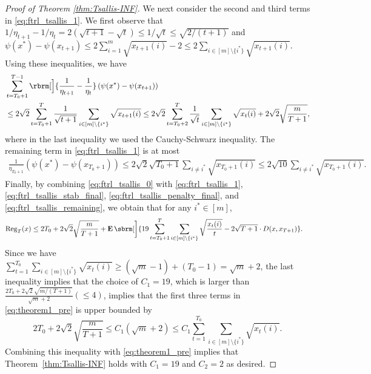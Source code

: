 \begin{proof}[Proof of Theorem \ref{thm:Tsallis-INF}]
We next consider the second and third terms in \eqref{eq:ftrl_tsallis_1}.
We first observe that 
$
{1}/{\eta_{t+1}}
-
{1}/{\eta_{t}}
=
2 (\sqrt{t+1} - \sqrt{t}) 
\leq
1/\sqrt{t}
\leq
\sqrt{2 / (t+1)}
$
and 
$\psi(x^*) - \psi(x_{t+1})
\leq
2 \sum_{i=1}^m \sqrt{x_{t+1}(i)} - 2
\leq
2 \sum_{i \in [m] \setminus \{i^*\}} \sqrt{x_{t+1}(i)}.
$
Using these inequalities, we have
\begin{align}
    &
    \sum_{t=T_0+1}^{T-1}
    \rbrm[\Big]{
        \frac{1}{\eta_{t+1}}
        -
        \frac{1}{\eta_{t}}
    }
    \left(
        \psi(x^*)
        -
        \psi( x_{t+1} )
    \right)
    \nonumber \\
    &\leq
    2 \sqrt{2} \sum_{t=T_0+1}^{T}
    \frac{1}{\sqrt{t+1}}
    \sum_{i \in [m] \setminus \{i^*\}} \sqrt{x_{t+1}(i)}
    \leq
    2 \sqrt{2} \sum_{t=T_0+2}^{T}
    \frac{1}{\sqrt{t}}
    \sum_{i \in [m] \setminus \{i^*\}} \sqrt{x_t(i)}
    +
    2 \sqrt{2} \sqrt{\frac{m}{T+1}}
    ,
    \label{eq:ftrl_tsallis_penalty_final}
\end{align}
where in the last inequality we used the Cauchy-Schwarz inequality.
The remaining term in \eqref{eq:ftrl_tsallis_1} is at most
\begin{align}
    \frac{1}{\eta_{T_0+1}} \left(
        \psi(x^*)
        -
        \psi(x_{T_0+1})
    \right)    
    \leq
    2 \sqrt{2} \sqrt{T_0 + 1} \sum_{i \neq i^* } \sqrt{x_{T_0+1}(i)}
    \leq
    2 \sqrt{10} \sum_{i \neq i^* } \sqrt{x_{T_0+1}(i)}
    .
    \label{eq:ftrl_tsallis_remaining}
\end{align}
Finally, by combining \eqref{eq:ftrl_tsallis_0} with \eqref{eq:ftrl_tsallis_1}, \eqref{eq:ftrl_tsallis_stab_final}, \eqref{eq:ftrl_tsallis_penalty_final}, and \eqref{eq:ftrl_tsallis_remaining},
we obtain that for any $i^* \in [m]$,
\begin{align}
    \Rr_T(x)
    &\leq
    2 T_0
    +
    2 \sqrt{2}
    \sqrt{\frac{m}{T+1}}
    +
    \E \sbrm[\bigg]{
        19
        \sum_{t=T_0+1}^T
        \sum_{i \in [m] \setminus \{i^*\}}
        \sqrt{\frac{x_t(i)}{t}}
        -
        2
        \sqrt{T+1}
        \cdot 
        D(x, x_{T+1})
    }.
    \label{eq:theorem1_pre}
\end{align}
Since we have 
$\sum_{t=1}^{T_0} \sum_{i \in [m] \setminus \{i^*\}} \sqrt{x_t(i)} 
\geq 
(\sqrt{m} - 1) + (T_0 - 1)
=
\sqrt{m} + 2
$,
the last inequality implies that the choice of 
$C_1 = 19$, which is larger than $\frac{2 T_0 + 2 \sqrt{2} \sqrt{m / (T+1)}}{\sqrt{m} + 2} (\leq 4)$,
implies that 
the first three terms in \eqref{eq:theorem1_pre} is upper bounded by
\begin{equation}
    2 T_0
    +
    2 \sqrt{2}
    \sqrt{\frac{m}{T+1}}
    \leq
    C_1 (\sqrt{m} + 2)
    \leq 
    C_1 
    \sum_{t=1}^{T_0}
    \sum_{i \in [m] \setminus \{i^*\}} \sqrt{x_t(i)}    
    .
    \nonumber
\end{equation}
Combining this inequality with \eqref{eq:theorem1_pre} implies that 
Theorem~\ref{thm:Tsallis-INF} holds with $C_1 = 19$ and $C_2 = 2$ as desired.
\end{proof}







